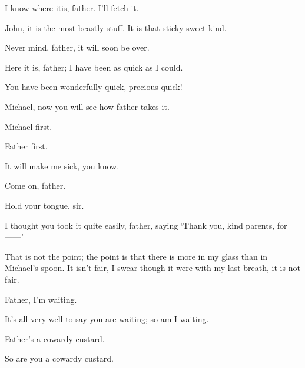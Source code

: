 \begin{drama}
I know where itis, father.
I’ll fetch it.


\mrdarlingspeaks
John, it is the most beastly stuff.
It is that sticky sweet kind.

Never mind, father, it will soon be over.


\wendyspeaks
Here it is, father; I have been as quick as I could.

You have been wonderfully quick, precious quick!


Michael, now you will see how father takes it.

Michael first.

Father first.

\mrdarlingspeaks
It will make me sick, you know.

Come on, father.

\mrdarlingspeaks
Hold your tongue, sir.

I thought you took it quite easily, father, saying ‘Thank you, kind parents, for——’

\mrdarlingspeaks
That is not the point; the point is that there is more in my glass than in Michael’s spoon.
It isn’t fair, I swear though it were with my last breath, it is not fair.

Father, I’m waiting.

\mrdarlingspeaks
It’s all very well to say you are waiting; so am I waiting.

\michaelspeaks
Father’s a cowardy custard.

\mrdarlingspeaks
So are you a cowardy custard.



\end{drama}
